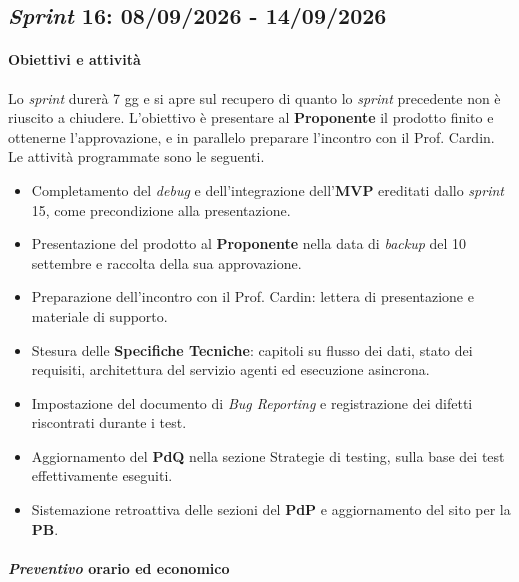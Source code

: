 \documentclass[12pt, a4paper]{article}
\begin{document}
{\subsection{\textit{Sprint} 16: 08/09/2026 - 14/09/2026}
\paragraph{Obiettivi e attività} Lo \textit{sprint} durerà 7 gg e si apre sul recupero di quanto lo \textit{sprint} precedente non è riuscito a chiudere. L'obiettivo è presentare al \textbf{Proponente} il prodotto finito e ottenerne l'approvazione, e in parallelo preparare l'incontro con il Prof. Cardin. Le attività programmate sono le seguenti.
\begin{itemize}
    \item Completamento del \textit{debug} e dell'integrazione dell'\textbf{MVP} ereditati dallo \textit{sprint} 15, come precondizione alla presentazione.
    \item Presentazione del prodotto al \textbf{Proponente} nella data di \textit{backup} del 10 settembre e raccolta della sua approvazione.
    \item Preparazione dell'incontro con il Prof. Cardin: lettera di presentazione e materiale di supporto.
    \item Stesura delle \textbf{Specifiche Tecniche}: capitoli su flusso dei dati, stato dei requisiti, architettura del servizio agenti ed esecuzione asincrona.
    \item Impostazione del documento di \textit{Bug Reporting} e registrazione dei difetti riscontrati durante i test.
    \item Aggiornamento del \textbf{PdQ} nella sezione Strategie di testing, sulla base dei test effettivamente eseguiti.
    \item Sistemazione retroattiva delle sezioni del \textbf{PdP} e aggiornamento del sito per la \textbf{PB}.
\end{itemize}

\paragraph{\textit{Preventivo} orario ed economico}

}
\end{document}
